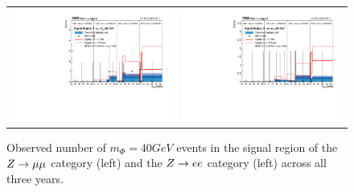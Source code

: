 \begin{figure}[htb!]
\begin{tabular}{c c}
		\includegraphics[width=0.45\linewidth]{figs/05_analysis/closure_ZH_MU_m40_data_2016.pdf} &
		\includegraphics[width=0.45\linewidth]{figs/05_analysis/closure_ZH_ELE_m40_data_2016.pdf} \\
	\end{tabular}
	\caption[Observed number of $m_\Phi=40\unit{GeV}$ events in the signal region of the $\VZ\to\mu\mu$ category (left) and the $\VZ\to ee$ category (left) across all three years.]{Observed number of $m_\Phi=40\unit{GeV}$ events in the signal region of the $\VZ\to\mu\mu$ category (left) and the $\VZ\to ee$ category (left) across all three years.}
	\label{fig:results_m40}
\end{figure}

